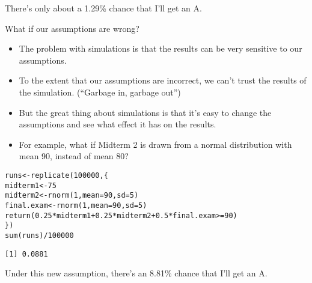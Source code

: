 \documentclass{beamer}\usepackage[]{graphicx}\usepackage[]{color}
\makeatletter
\newcommand{\hlnum}[1]{\textcolor[rgb]{0.824,0.412,0.118}{#1}}%
\newcommand{\hlopt}[1]{\textcolor[rgb]{1,0.894,0.769}{#1}}%
\newcommand{\hlstd}[1]{\textcolor[rgb]{1,0.894,0.769}{#1}}%
\newcommand{\hlkwb}[1]{\textcolor[rgb]{0.804,0.776,0.451}{#1}}%
\newcommand{\hlkwc}[1]{\textcolor[rgb]{0.78,0.941,0.545}{#1}}%
\newcommand{\hlkwd}[1]{\textcolor[rgb]{1,0.78,0.769}{#1}}%
\newenvironment{kframe}{%
 \def\at@end@of@kframe{}%
 \ifinner\ifhmode%
  \def\at@end@of@kframe{\end{minipage}}%
  \begin{minipage}{\columnwidth}%
 \fi\fi%
 \def\FrameCommand##1{\hskip\@totalleftmargin \hskip-\fboxsep
 \colorbox{shadecolor}{##1}\hskip-\fboxsep
     \hskip-\linewidth \hskip-\@totalleftmargin \hskip\columnwidth}%
 \MakeFramed {\advance\hsize-\width
   \@totalleftmargin\z@ \linewidth\hsize
   \@setminipage}}%
 {\par\unskip\endMakeFramed%
 \at@end@of@kframe}
\newenvironment{knitrout}{}{} %
\makeatother
\begin{document}
\begin{darkframes}
\begin{frame}[fragile]
      \pause
      There's only about a 1.29\% chance that I'll get an A.
    \end{frame}

    \begin{frame}{What if our assumptions are wrong?}
      \begin{itemize}[<+->]
        \item The problem with simulations is that the results can be very sensitive to our assumptions.
        \item To the extent that our assumptions are incorrect, we can't trust the results of the simulation. (``Garbage in, garbage out'')
        \item But the great thing about simulations is that it's easy to change the assumptions and see what effect it has on the results.
        \item For example, what if Midterm 2 is drawn from a normal distribution with mean 90, instead of mean 80?
      \end{itemize}
    \end{frame}

    \begin{frame}[fragile]
      \fontsm
\begin{knitrout}
\begin{kframe}
\begin{alltt}
\hlstd{runs} \hlkwb{<-} \hlkwd{replicate}\hlstd{(}\hlnum{100000}\hlstd{, \{}
  \hlstd{midterm1} \hlkwb{<-} \hlnum{75}
  \hlstd{midterm2} \hlkwb{<-} \hlkwd{rnorm}\hlstd{(}\hlnum{1}\hlstd{,} \hlkwc{mean}\hlstd{=}\hlnum{90}\hlstd{,} \hlkwc{sd}\hlstd{=}\hlnum{5}\hlstd{)}
  \hlstd{final.exam} \hlkwb{<-} \hlkwd{rnorm}\hlstd{(}\hlnum{1}\hlstd{,} \hlkwc{mean}\hlstd{=}\hlnum{90}\hlstd{,} \hlkwc{sd}\hlstd{=}\hlnum{5}\hlstd{)}
  \hlkwd{return}\hlstd{(}\hlnum{0.25}\hlopt{*}\hlstd{midterm1} \hlopt{+} \hlnum{0.25}\hlopt{*}\hlstd{midterm2} \hlopt{+} \hlnum{0.5}\hlopt{*}\hlstd{final.exam} \hlopt{>=} \hlnum{90}\hlstd{)}
\hlstd{\})}
\hlkwd{sum}\hlstd{(runs)} \hlopt{/} \hlnum{100000}
\end{alltt}
\begin{verbatim}
[1] 0.0881
\end{verbatim}
\end{kframe}
\end{knitrout}

      \pause
      Under this new assumption, there's an 8.81\% chance that I'll get an A.
    \end{frame}
  \end{darkframes}
\end{document}
